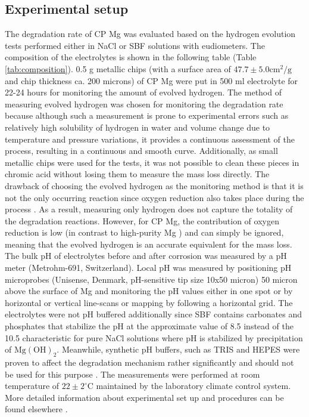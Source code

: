 \subsection{Experimental setup}

The degradation rate of CP Mg was evaluated based on the hydrogen evolution tests  performed either in  NaCl or SBF solutions with eudiometers. The composition of the electrolytes is  shown in the following table (Table \ref{tab:composition}). 0.5 g metallic chips (with a surface area of $47.7\pm5.0 \mathrm{cm}^2/\mathrm{g}$ and chip thickness ca. 200 microns) of CP Mg were put in 500 ml electrolyte for 22-24 hours for monitoring the amount of evolved hydrogen. The method of measuring evolved hydrogen was chosen for monitoring the degradation rate because although such a measurement is prone to experimental errors such as relatively high solubility of hydrogen in water and volume change due to temperature and pressure variations, it provides a continuous assessment of the process, resulting in a continuous and smooth curve. Additionally, as small metallic chips were used for the tests, it was not possible to clean these pieces in chromic acid without losing them to measure the mass loss directly. The drawback of choosing the evolved hydrogen as the monitoring method is that it is not the only occurring reaction since oxygen reduction also takes place during the process \cite{Wang2020,Strebl2020,Silva2018}. As a result,  measuring only hydrogen does not capture the totality of the degradation reactions. However, for CP Mg, the contribution of oxygen reduction is low (in contrast to high-purity Mg \cite{Wang2020}) and can simply be ignored, meaning that the evolved hydrogen is an accurate equivalent for the mass loss. The bulk pH of electrolytes before and after corrosion was measured by a pH meter (Metrohm-691, Switzerland). Local pH was measured by positioning pH microprobes (Unisense, Denmark, pH-sensitive tip size 10x50 micron) 50 micron above the surface of Mg and monitoring the pH values either in one spot or by horizontal or vertical line-scans or mapping by following a horizontal grid. The electrolytes were not pH buffered additionally since SBF contains carbonates and phosphates that stabilize the pH at the approximate value of 8.5 instead of the 10.5 characteristic for pure NaCl solutions where pH is stabilized by precipitation of $\mathrm{Mg}(\mathrm{OH})_{2}$.  Meanwhile, synthetic pH buffers, such as TRIS and HEPES were proven to affect the degradation mechanism rather significantly and should not be used for this purpose \cite{Mei2020}. The measurements were performed at room temperature of $22\pm2^{\circ}\mathrm{C}$ maintained by the laboratory climate control system. More detailed information about experimental set up and procedures  can be found  elsewhere \cite{Mei2019,Mei2019a}.


